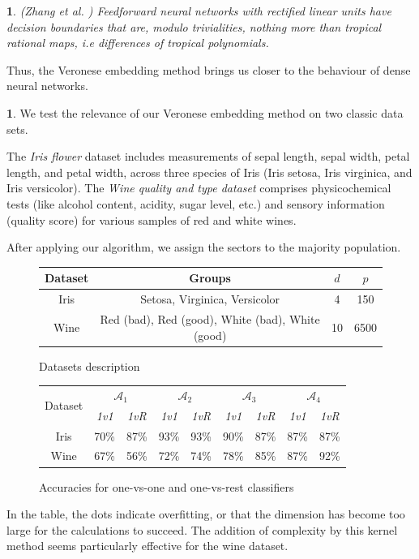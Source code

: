 \documentclass[oneside,english]{amsart}
\numberwithin{equation}{section}
\numberwithin{figure}{section}
\theoremstyle{plain}
\theoremstyle{definition}
\theoremstyle{plain}
\newtheorem{prop}[thm]{\protect\propositionname}
\theoremstyle{remark}
\theoremstyle{plain}
\theoremstyle{definition}
\newtheorem{example}[thm]{\protect\examplename}
\theoremstyle{definition}
\providecommand{\propositionname}{Proposition}
\providecommand{\examplename}{Example}
\begin{document}
\begin{prop}
\emph{(Zhang et al. \cite{zhang2018tropical})} Feedforward neural networks with rectified linear units have decision boundaries that are, modulo trivialities, nothing more than tropical rational maps, i.e differences of tropical polynomials. 
\end{prop}

Thus, the Veronese embedding method brings us closer to the behaviour of dense neural networks.

\begin{example}
We test the relevance of our Veronese embedding method on two classic data sets.

The \emph{Iris flower} dataset includes measurements of sepal length, sepal width, petal length, and petal width, across three species of Iris (Iris setosa, Iris virginica, and Iris versicolor). The \emph{Wine quality and type dataset} comprises physicochemical tests (like alcohol content, acidity,
sugar level, etc.) and sensory information (quality score) for various samples of red and white wines.

After applying our algorithm, we assign the sectors to the majority population.

\begin{figure}[!h]
\begin{tabular}{|c|c|c|c|}
\hline 
Dataset  & Groups  & $d$  & $p$\tabularnewline
\hline 
\hline 
Iris  & Setosa, Virginica, Versicolor  & 4  & 150\tabularnewline
\hline 
Wine  & Red (bad), Red (good), White (bad), White (good)  & 10  & 6500\tabularnewline
\hline 
\end{tabular}

\caption{Datasets description}
\end{figure}

\begin{figure}[!h]
\begin{tabular}{|c|c|c|c|c|c|c|c|c|}
\hline 
\multirow{2}{*}{Dataset} & \multicolumn{2}{c|}{$\mathcal{A}_{1}$} & \multicolumn{2}{c|}{$\mathcal{A}_{2}$} & \multicolumn{2}{c|}{$\mathcal{A}_{3}$} & \multicolumn{2}{c|}{$\mathcal{A}_{4}$}\tabularnewline
\cline{2-9} \cline{3-9} \cline{4-9} \cline{5-9} \cline{6-9} \cline{7-9} \cline{8-9} \cline{9-9} 
 & \emph{1v1}  & \emph{1vR}  & \emph{1v1}  & \emph{1vR}  & \emph{1v1}  & \emph{1vR}  & \emph{1v1}  & \emph{1vR} \tabularnewline
\hline 
Iris  & 70\%  & 87\%  & 93\%  & 93\%  & 90\%  & 87\%  & 87\%  & 87\%\tabularnewline
\hline 
Wine  & 67\%  & 56\%  & 72\%  & 74\%  & 78\%  & 85\%  & 87\%  & 92\%\tabularnewline
\hline 
\end{tabular}

\caption{Accuracies for one-vs-one and one-vs-rest classifiers}
\end{figure}

In the table, the dots indicate overfitting, or that the dimension
has become too large for the calculations to succeed. The addition
of complexity by this kernel method seems particularly effective for
the wine dataset.

\end{example}
\end{document}
